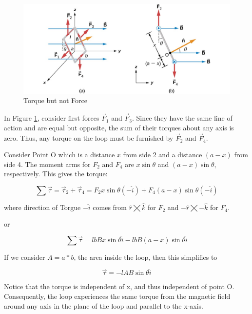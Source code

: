 \documentclass[14pt]{memoir}
\begin{document}
\begin{figure}[H]
\begin{center}
\includegraphics[scale=0.50]{fig/fig_11_16.jpg}
\caption{Torque but not Force}
\label{fig:11_16}
\end{center}
\end{figure}

In Figure \ref{fig:11_16}, consider first forces $\vec{F}_1$ and $\vec{F}_3$. Since they have the same line of action and are equal but opposite, the sum of their torques about any axis is zero. Thus, any torque on the loop must be furnished by  $\vec{F}_2$ and $\vec{F}_4$.

Consider Point O which is a distance $x$ from side 2 and a distance $(a-x)$ from side 4. The moment arms for $F_2$ and $F_4$ are $x\sin{\theta}$ and $(a-x)\sin{\theta}$, respectively. This gives the torque:


\begin{equation}
\sum \vec{\tau} = \vec{\tau}_2 + \vec{\tau}_4 = F_2 x \sin{\theta} (-\hat{i}) + F_4 (a-x) \sin{\theta} (-\hat{i})
\end{equation}

where direction of Torgue $-\hat{i}$ comes from $\hat{r} \bigtimes \hat{k}$ for $F_2$ and $-\hat{r} \bigtimes -\hat{k}$ for $F_4$.

or 

\begin{equation}
\sum \vec{\tau} = l b B x \sin{\theta} \hat{i} - l b B (a-x) \sin{\theta} \hat{i}
\end{equation}

If we consider $A = a * b$, the area inside the loop, then this simplifies to 

\begin{equation}
\vec{\tau} = - l AB \sin{\theta} \hat{i}
\end{equation}

Notice that the torque is independent of x, and thus independent of point O. Consequently, the loop experiences the same torque from the magnetic field around any axis in the plane of the loop and parallel to the x-axis. 
\end{document}
